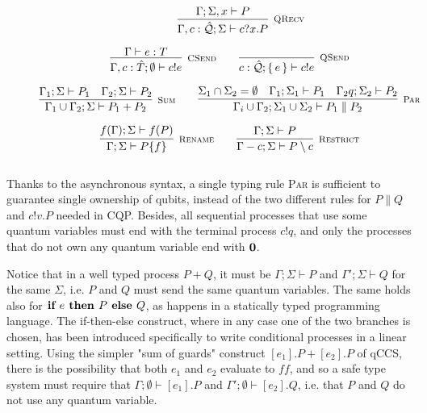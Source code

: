 \begin{figure}[h!]
\begin{gather*}
\qquad
\infer[\mbox{\footnotesize\scshape QRecv}]
{\Gamma, c : \hat{\mathcal{Q}}; \Sigma \vdash c?x . P}
{ \Gamma; \Sigma, x \vdash P} 
\\[0.2cm]
\infer[\mbox{\footnotesize\scshape CSend}]{\Gamma, c : \hat{T}; \emptyset \vdash c!e}{ \Gamma \vdash e : T} \qquad
\infer[\mbox{\footnotesize\scshape QSend}]{c : \hat{\mathcal{Q}} ; \set{e} \vdash c!e}{} \\[0.2cm]
\infer[\mbox{\footnotesize\scshape Sum}]{\Gamma_1 \cup \Gamma_2; \Sigma \vdash P_1 + P_2}{\Gamma_1; \Sigma \vdash P_1 & \Gamma_2; \Sigma \vdash P_2} \qquad 
\infer[\mbox{\footnotesize\scshape Par}]{\Gamma_i \cup \Gamma_2; \Sigma_1 \cup \Sigma_2 \vdash P_1 \parallel P_2}
{\Sigma_1 \cap \Sigma_2 = \emptyset & \Gamma_1; \Sigma_1 \vdash P_1 & \Gamma_2 q; \Sigma_2 \vdash P_2} \\[0.2cm]
\infer[\mbox{\footnotesize\scshape Rename}]{\Gamma; \Sigma \vdash P \{f\}}{f(\Gamma); \Sigma \vdash f(P)} \qquad
\infer[\mbox{\footnotesize\scshape Restrict}]{\Gamma - c; \Sigma \vdash P \setminus c}{\Gamma; \Sigma \vdash P} \\[0.3cm]
\end{gather*}
\end{figure}

Thanks to the asynchronous syntax, a single typing rule {\scshape Par} is sufficient to guarantee single ownership of qubits, instead of the two different rules for $P \parallel Q$ and $c!v.P$ needed in CQP. Besides, all sequential processes that use some quantum variables must end with the terminal process $c!q$, and only the processes that do not own any quantum variable end with $\mathbf{0}$. 

Notice that in a well typed process $P + Q$, it must be $\Gamma; \Sigma \vdash P$ and $\Gamma'; \Sigma \vdash Q$ for the same $\Sigma$, i.e. $P$ and $Q$ must send the same quantum variables. The same holds also for $\textbf{if } e \textbf{ then } P \textbf{ else } Q$, as happens in a statically typed programming language. The if-then-else construct, where in any case one of the two branches is chosen, has been introduced specifically to write conditional processes in a linear setting. Using the simpler "sum of guards" construct $[e_1].P + [e_2].P$ of qCCS, there is the possibility that both $e_1$ and $e_2$ evaluate to $ff$, and so a safe type system must require that $\Gamma; \emptyset \vdash [e_1].P$ and $\Gamma'; \emptyset \vdash [e_2].Q$, i.e. that $P$ and $Q$ do not use any quantum variable. 

